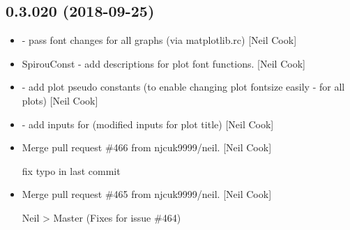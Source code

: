 \documentclass[a4paper,10pt,english]{report}
\begin{document}
\subsection{0.3.020 (2018-09-25)}
\label{\detokenize{misc/changelog:id311}}\begin{itemize}
\item {} 
 - pass font changes for all graphs (via matplotlib.rc)
{[}Neil Cook{]}

\item {} 
SpirouConst - add descriptions for plot font functions. {[}Neil Cook{]}

\item {} 
 - add plot pseudo constants (to enable changing plot
fontsize easily - for all plots) {[}Neil Cook{]}

\item {} 
 - add inputs for  (modified
inputs for plot title) {[}Neil Cook{]}

\item {} 
Merge pull request \#466 from njcuk9999/neil. {[}Neil Cook{]}

fix typo in last commit

\item {} 
Merge pull request \#465 from njcuk9999/neil. {[}Neil Cook{]}

Neil \textendash{}\textgreater{} Master (Fixes for issue \#464)

\end{itemize}
\end{document}
